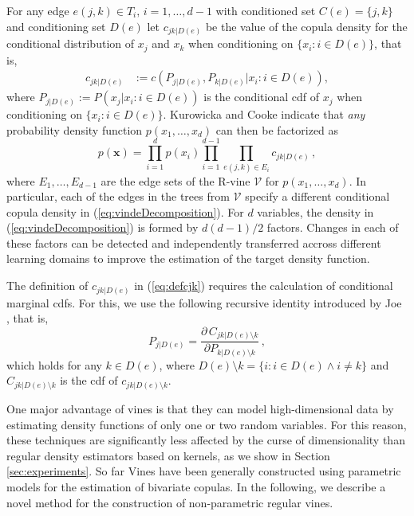 \documentclass{article}
\begin{document}
For any edge $e(j,k)\in T_i,\,i=1,\ldots,d-1$ with conditioned set
$C(e)=\{j,k\}$ and conditioning set $D(e)$ let $c_{jk|D(e)}$ be the value of
the copula density for the conditional distribution of $x_j$ and $x_k$ when
conditioning on $\{x_i: i \in D(e) \}$, that is, 
\begin{align}
c_{jk|D(e)} & := c( P_{j|D(e)}, P_{k|D(e)}| x_i : i \in D(e)),\label{eq:defcjk}
\end{align}
where $P_{j|D(e)}:=P(x_j|x_i : i \in D(e))$ is the conditional cdf of $x_j$
when conditioning on $\{x_i: i \in D(e) \}$.  Kurowicka and Cooke
\cite{kurowicka} indicate that \emph{any} probability density function
$p(x_1,\ldots,x_d)$ can then be factorized as
\begin{equation}
p(\mathbf{x}) = \prod_{i=1}^d p(x_i) \prod_{i=1}^{d-1} \prod_{e(j,k) \in E_i}
c_{jk|D(e)}\,,\label{eq:vindeDecomposition}
\end{equation}
where $E_1,\ldots,E_{d-1}$ are the edge sets of the R-vine $\mathcal{V}$ for
$p(x_1,\ldots,x_d)$.  In particular, each of the edges in the trees from
$\mathcal{V}$ specify a different conditional copula density in
(\ref{eq:vindeDecomposition}). For $d$ variables, the density in
(\ref{eq:vindeDecomposition}) is formed by $d(d-1)/2$ factors. Changes in each
of these factors can be detected and independently transferred accross
different learning domains to improve the estimation of the target density
function.

The definition of $c_{jk|D(e)}$ in (\ref{eq:defcjk}) requires the calculation
of conditional marginal cdfs. For this, we use the following recursive identity
introduced by Joe \cite{joe}, that is,
\begin{equation}
P_{j|D(e)} = \frac{\partial\, C_{jk|D(e)\setminus k }}{\partial P_{k|D(e)
\setminus k}}\,,\label{eq:h_function}
\end{equation}
which holds for any $k \in D(e)$, where $D(e) \setminus k = \{i: i \in D(e)
\wedge i \neq k\}$ and $C_{jk|D(e)\setminus k}$ is the cdf of
$c_{jk|D(e)\setminus k}$.

One major advantage of vines is that they can model high-dimensional data by
estimating density functions of only one or two random variables. For this
reason, these techniques are significantly less affected by the curse of
dimensionality than regular density estimators based on kernels, as we show in
Section \ref{sec:experiments}.  So far Vines have been generally constructed
using parametric models for the estimation of bivariate copulas.  In the
following, we describe a novel method for the construction of non-parametric
regular vines.
\end{document}
